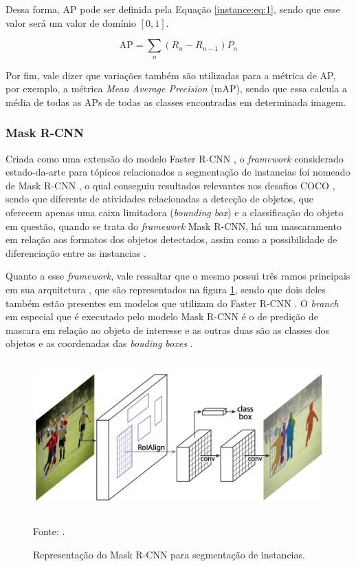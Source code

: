 Dessa forma, AP pode ser definida pela Equação \ref{instance:eq:1}, sendo que esse valor será um valor de domínio $[0,1]$.

\begin{equation}
    \label{instance:eq:1}
    \text{AP} = \sum_n (R_n - R_{n-1}) P_n
\end{equation}

Por fim, vale dizer que variações também são utilizadas para a métrica de AP, por exemplo, a métrica \textit{Mean Average Precision} (mAP), sendo que essa calcula a média de todas as APs de todas as classes encontradas em determinada imagem.


\subsubsection{Mask R-CNN}
\label{instance:mask}

Criada como uma extensão do modelo Faster R-CNN \cite{Ren2017FasterNetworks}, o \textit{framework} considerado estado-da-arte para tópicos relacionados a segmentação de instancias foi nomeado de Mask R-CNN \cite{He2020}, o qual conseguiu resultados relevantes nos desafios COCO \cite{Lin2016}, sendo que diferente de atividades relacionadas a detecção de objetos, que oferecem apenas uma caixa limitadora (\textit{bounding box}) e a classificação do objeto em questão, quando se trata do \textit{framework} Mask R-CNN, há um mascaramento em relação aos formatos dos objetos detectados, assim como a possibilidade de diferenciação entre as instancias \cite{Hafiz2020}.

Quanto a esse \textit{framework}, vale ressaltar que o mesmo possui três ramos principais em sua arquitetura \cite{He2020, Minaee2021}, que são representados na figura \ref{instance:fig:2}, sendo que dois deles também estão presentes em modelos que utilizam do Faster R-CNN \cite{Ren2017FasterNetworks}. O \textit{branch} em especial que é executado pelo modelo Mask R-CNN é o de predição de mascara em relação ao objeto de interesse e as outras duas são as classes dos objetos e as coordenadas das \textit{bouding boxes} \cite{Minaee2021}.

\begin{figure}[H]
    \centering
    \caption{Representação do Mask R-CNN para segmentação de instancias.}
    \includegraphics[height=2.3in]{recursos/imagens/instance/Mask-R-CNN_examp.png}
    \label{instance:fig:2}

    \vspace*{1 cm}
    Fonte: \cite{He2020}.
\end{figure}

